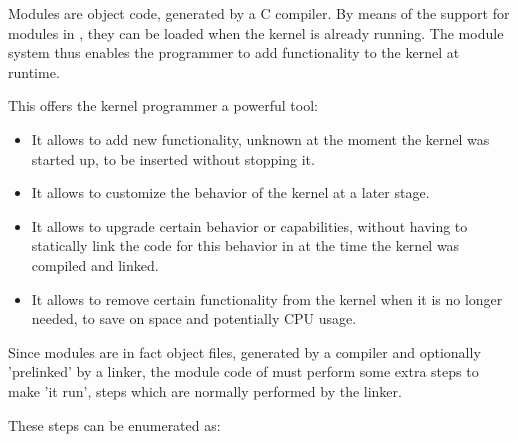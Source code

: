 Modules are object code, generated by a C
compiler. By means of the support for modules in \oswald, they can be loaded when 
the kernel is already running. The module system thus enables the programmer 
to add functionality to the kernel at runtime.

This offers the kernel programmer a powerful tool:

\begin{itemize}
\item It allows to add new functionality, unknown at the moment the kernel
was started up, to be inserted without stopping it.
\item It allows to customize the behavior of the kernel at a later stage.
\item It allows to upgrade certain behavior or capabilities, without
having to statically link the code for this behavior in at the time the
kernel was compiled and linked.
\item It allows to remove certain functionality from the kernel when it is
no longer needed, to save on space and potentially CPU usage.
\end{itemize}

Since modules are in fact object files, generated by a compiler and
optionally 'prelinked' by a linker, the module code of \oswald must perform
some extra steps to make 'it run', steps which are normally performed
by the linker.

These steps can be enumerated as:

